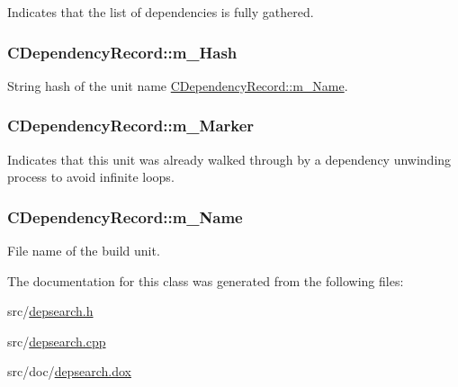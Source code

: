 Indicates that the list of dependencies is fully gathered. 

\hypertarget{classCDependencyRecord_a4431e94dbd98487fcd0e9852b7cffa57}{
\subsubsection[{m\-\_\-\-Hash}]{\setlength{\rightskip}{0pt plus 5cm}C\-Dependency\-Record\-::m\-\_\-\-Hash\hspace{0.3cm}{\ttfamily [private]}}}\label{classCDependencyRecord_a4431e94dbd98487fcd0e9852b7cffa57}


String hash of the unit name \hyperlink{classCDependencyRecord_a1eb617707168568e4d2c503150354f09}{C\-Dependency\-Record\-::m\-\_\-\-Name}. 

\hypertarget{classCDependencyRecord_a0327e854ac8b0bc48eefe3155a84475e}{
\subsubsection[{m\-\_\-\-Marker}]{\setlength{\rightskip}{0pt plus 5cm}C\-Dependency\-Record\-::m\-\_\-\-Marker\hspace{0.3cm}{\ttfamily [private]}}}\label{classCDependencyRecord_a0327e854ac8b0bc48eefe3155a84475e}


Indicates that this unit was already walked through by a dependency unwinding process to avoid infinite loops. 

\hypertarget{classCDependencyRecord_a1eb617707168568e4d2c503150354f09}{
\subsubsection[{m\-\_\-\-Name}]{\setlength{\rightskip}{0pt plus 5cm}C\-Dependency\-Record\-::m\-\_\-\-Name\hspace{0.3cm}{\ttfamily [private]}}}\label{classCDependencyRecord_a1eb617707168568e4d2c503150354f09}


File name of the build unit. 



The documentation for this class was generated from the following files\-:\begin{DoxyCompactItemize}
\item 
src/\hyperlink{depsearch_8h}{depsearch.\-h}\item 
src/\hyperlink{depsearch_8cpp}{depsearch.\-cpp}\item 
src/doc/\hyperlink{depsearch_8dox}{depsearch.\-dox}\end{DoxyCompactItemize}
